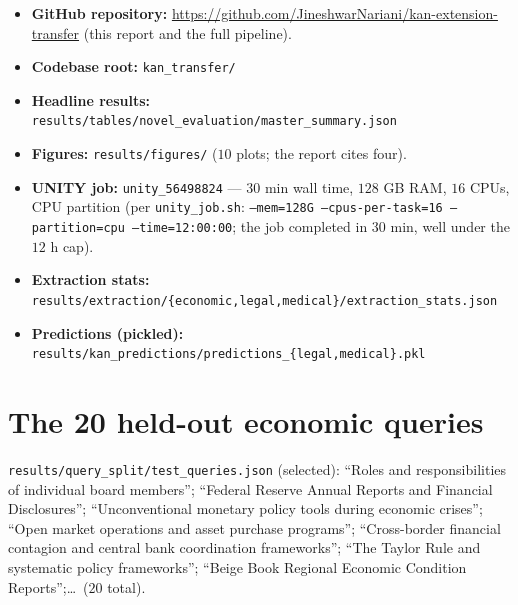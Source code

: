 \documentclass[10pt,letterpaper]{article}
\begin{document}
\begin{itemize}\itemsep0pt
\item \textbf{GitHub repository:} \url{https://github.com/JineshwarNariani/kan-extension-transfer} (this report and the full pipeline).
\item \textbf{Codebase root:} \texttt{kan\_transfer/}
\item \textbf{Headline results:} \texttt{results/tables/novel\_evaluation/master\_summary.json}
\item \textbf{Figures:} \texttt{results/figures/} ($10$ plots; the report cites four).
\item \textbf{UNITY job:} \texttt{unity\_56498824} --- $30$ min wall time, $128$ GB RAM, $16$ CPUs, CPU partition (per \texttt{unity\_job.sh}: \texttt{--mem=128G --cpus-per-task=16 --partition=cpu --time=12:00:00}; the job completed in $30$ min, well under the $12$ h cap).
\item \textbf{Extraction stats:} \texttt{results/extraction/\{economic,legal,medical\}/extraction\_stats.json}
\item \textbf{Predictions (pickled):} \texttt{results/kan\_predictions/predictions\_\{legal,medical\}.pkl}
\end{itemize}

\section{The 20 held-out economic queries}

\texttt{results/query\_split/test\_queries.json} (selected): ``Roles and responsibilities of individual board members''; ``Federal Reserve Annual Reports and Financial Disclosures''; ``Unconventional monetary policy tools during economic crises''; ``Open market operations and asset purchase programs''; ``Cross-border financial contagion and central bank coordination frameworks''; ``The Taylor Rule and systematic policy frameworks''; ``Beige Book Regional Economic Condition Reports'';\ldots\ ($20$ total).
\end{document}

